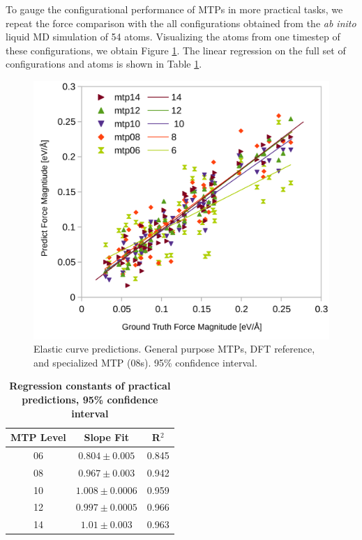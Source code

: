 \documentclass[9pt,twocolumn,twoside]{opticajnl}
\begin{document}
To gauge the configurational performance of MTPs in more practical tasks, we repeat the force comparison with the all configurations obtained from the \textit{ab inito} liquid MD simulation of 54 atoms. Visualizing the atoms from one timestep of these configurations, we obtain Figure \ref{fig:aimdconfigs}. The linear regression on the full set of configurations and atoms is shown in Table \ref{tab:aimdconfigs}.

\begin{figure}[ht]
  \centering
  \includegraphics[width=\linewidth]{assets/aimdconfigurations.png}
  \caption{Elastic curve predictions. General purpose MTPs, DFT reference, and specialized MTP (08s). 95\% confidence interval.}
  \label{fig:aimdconfigs}
\end{figure}

\begin{table}[htbp]
  \centering
  \caption{\bf Regression constants of practical predictions, 95\% confidence interval }
  \begin{tabular}{ccc}
  \hline
  MTP Level & Slope Fit &  R$^2$\\ 
  \hline
  06 & $0.804 \pm 0.005$ & 0.845 \\
  08 & $0.967 \pm 0.003$ & 0.942  \\
  10 & $1.008 \pm 0.0006$ & 0.959 \\
  12 & $0.997 \pm 0.0005$ & 0.966 \\
  14 & $1.01 \pm 0.003$ & 0.963 \\
  \hline
  \end{tabular}
  \label{tab:aimdconfigs}
\end{table}
\end{document}
